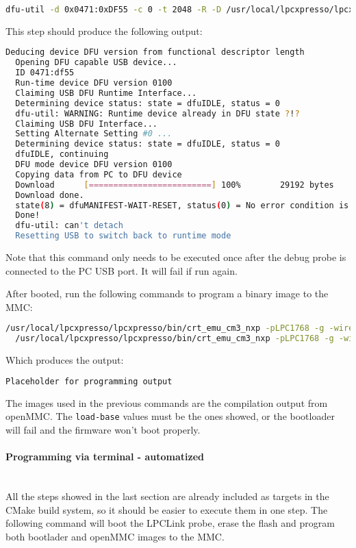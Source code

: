 \documentclass[letterpaper,12pt, titlepage]{article}
\newcommand{\newparagraph}[1]{\paragraph{#1}\mbox{}\\}
\begin{document}
\begin{lstlisting}[language=bash]
  dfu-util -d 0x0471:0xDF55 -c 0 -t 2048 -R -D /usr/local/lpcxpresso/lpcxpresso/bin/LPCXpressoWIN.enc
\end{lstlisting}

This step should produce the following output:

\begin{lstlisting}[language=bash]
  Deducing device DFU version from functional descriptor length
  Opening DFU capable USB device...
  ID 0471:df55
  Run-time device DFU version 0100
  Claiming USB DFU Runtime Interface...
  Determining device status: state = dfuIDLE, status = 0
  dfu-util: WARNING: Runtime device already in DFU state ?!?
  Claiming USB DFU Interface...
  Setting Alternate Setting #0 ...
  Determining device status: state = dfuIDLE, status = 0
  dfuIDLE, continuing
  DFU mode device DFU version 0100
  Copying data from PC to DFU device
  Download      [=========================] 100%        29192 bytes
  Download done.
  state(8) = dfuMANIFEST-WAIT-RESET, status(0) = No error condition is present
  Done!
  dfu-util: can't detach
  Resetting USB to switch back to runtime mode
\end{lstlisting}

Note that this command only needs to be executed once after the debug probe is connected to the PC USB port. It will fail if run again.

After booted, run the following commands to program a binary image to the MMC:

\begin{lstlisting}[language=bash]
  /usr/local/lpcxpresso/lpcxpresso/bin/crt_emu_cm3_nxp -pLPC1768 -g -wire=winusb -load-base=0 -flash-load-exec=bootloader.bin
  /usr/local/lpcxpresso/lpcxpresso/bin/crt_emu_cm3_nxp -pLPC1768 -g -wire=winusb -load-base=0x2000 -flash-load-exec=openMMC.bin
\end{lstlisting}

Which produces the output:

\begin{lstlisting}[language=bash]
  Placeholder for programming output
\end{lstlisting}

The images used in the previous commands are the compilation output from openMMC. The \texttt{load-base} values must be the ones showed, or the bootloader will fail and the firmware won't boot properly.

\newparagraph{Programming via terminal - automatized}
All the steps showed in the last section are already included as targets in the CMake build system, so it should be easier to execute them in one step. The following command will boot the LPCLink probe, erase the flash and program both bootlader and openMMC images to the MMC.
\end{document}
